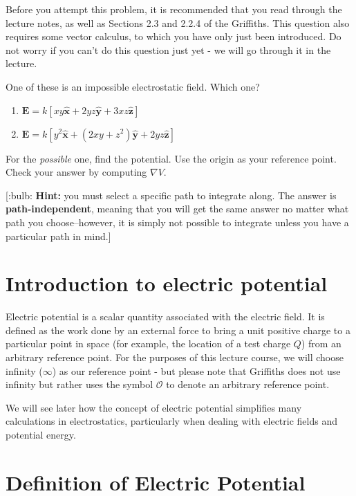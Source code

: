 \documentclass[
  letterpaper,
  DIV=11,
  numbers=noendperiod]{scrreprt}
\begin{document}
Before you attempt this problem, it is recommended that you read through
the lecture notes, as well as Sections 2.3 and 2.2.4 of the Griffiths.
This question also requires some vector calculus, to which you have only
just been introduced. Do not worry if you can't do this question just
yet - we will go through it in the lecture.

One of these is an impossible electrostatic field. Which one?

\begin{enumerate}
\def\labelenumi{(\alph{enumi})}
\item
  \(\mathrm{\mathbf{E}}= k[ xy \hat{\mathrm{\mathbf{x}}} + 2yz \hat{\mathrm{\mathbf{y}}} + 3xz \hat{\mathrm{\mathbf{z}}} ]\)
\item
  \(\mathrm{\mathbf{E}}= k[ y^2 \hat{\mathrm{\mathbf{x}}} + (2xy + z^2)\hat{\mathrm{\mathbf{y}}} + 2yz \hat{\mathrm{\mathbf{z}}} ]\)
\end{enumerate}

For the \emph{possible} one, find the potential. Use the origin as your
reference point. Check your answer by computing \(\nabla V\).

{[}:bulb: \textbf{Hint:} you must select a specific path to integrate
along. The answer is \textbf{path-independent}, meaning that you will
get the same answer no matter what path you choose--however, it is
simply not possible to integrate unless you have a particular path in
mind.{]}

\section{Introduction to electric
potential}\label{introduction-to-electric-potential}

Electric potential is a scalar quantity associated with the electric
field. It is defined as the work done by an external force to bring a
unit positive charge to a particular point in space (for example, the
location of a test charge \(Q\)) from an arbitrary reference point. For
the purposes of this lecture course, we will choose infinity
(\(\infty\)) as our reference point - but please note that Griffiths
does not use infinity but rather uses the symbol \(\mathcal{O}\) to
denote an arbitrary reference point.

We will see later how the concept of electric potential simplifies many
calculations in electrostatics, particularly when dealing with electric
fields and potential energy.

\section{Definition of Electric
Potential}\label{definition-of-electric-potential}
\end{document}
